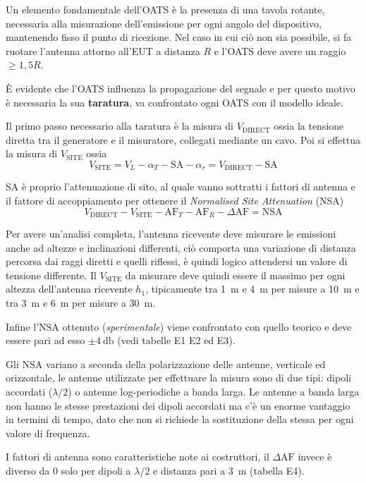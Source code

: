 
Un elemento fondamentale dell'OATS è la presenza di una tavola rotante, necessaria
alla misurazione dell'emissione per ogni angolo del dispositivo, mantenendo
fisso il punto di ricezione. Nel caso in cui ciò non sia possibile,
si fa ruotare l'antenna attorno all'EUT a distanza $R$ e l'OATS deve
avere un raggio $\geq 1,5R$.

È evidente che l'OATS influenza la propagazione del segnale e per questo motivo
è necessaria la sua \textbf{taratura}, va confrontato ogni OATS con il modello ideale.

Il primo passo necessario alla taratura è la misura di $V_{\text{DIRECT}}$ ossia la tensione
diretta tra il generatore e il misuratore, collegati mediante un cavo.
Poi si effettua la misura di $V_{\text{SITE}}$ ossia 
$$
V_{\text{SITE}} = V_L -\alpha_T - \text{SA} - \alpha_r = V_{\text{DIRECT}} - \text{SA}
$$

SA è proprio l'attenuazione di sito, al quale vanno sottratti i fattori di antenna e il
fattore di accoppiamento per ottenere il \textit{Normalised Site Attenuation} (NSA)
$$
V_{\text{DIRECT}} - V_{\text{SITE}} - \text{AF}_T - \text{AF}_R - \Delta\text{AF} = \text{NSA}
$$

Per avere un'analisi completa, l'antenna ricevente deve misurare le emissioni anche ad altezze
e inclinazioni differenti, ciò comporta una variazione di distanza percorsa dai raggi diretti e quelli riflessi,
è quindi logico attendersi un valore di tensione differente.
Il $V_{\text{SITE}}$ da misurare deve quindi essere il massimo per ogni altezza dell'antenna ricevente $h_1$,
tipicamente tra \SI{1}{\meter} e \SI{4}{\meter} per misure a \SI{10}{\meter} e tra \SI{3}{\meter} 
e \SI{6}{\meter} per misure a \SI{30}{\meter}.

Infine l'NSA ottenuto (\textit{sperimentale}) viene confrontato con quello teorico e deve essere pari
ad esso $\pm\SI{4}{\decibel}$ (vedi tabelle E1 E2 ed E3).

Gli NSA variano a seconda della polarizzazione delle antenne, verticale ed orizzontale,
le antenne utilizzate per effettuare la misura sono di due tipi: dipoli accordati ($\lambda/2$) 
o antenne log-periodiche a banda larga. Le antenne a banda larga non hanno le stesse prestazioni dei
dipoli accordati ma c'è un enorme vantaggio in termini di tempo, dato che non si richiede la sostituzione
della stessa per ogni valore di frequenza.

I fattori di antenna sono caratteristiche note ai costruttori, il $\Delta\text{AF}$ invece è diverso da 0
solo per dipoli a $\lambda/2$ e distanza pari a \SI{3}{\meter} (tabella E4).

